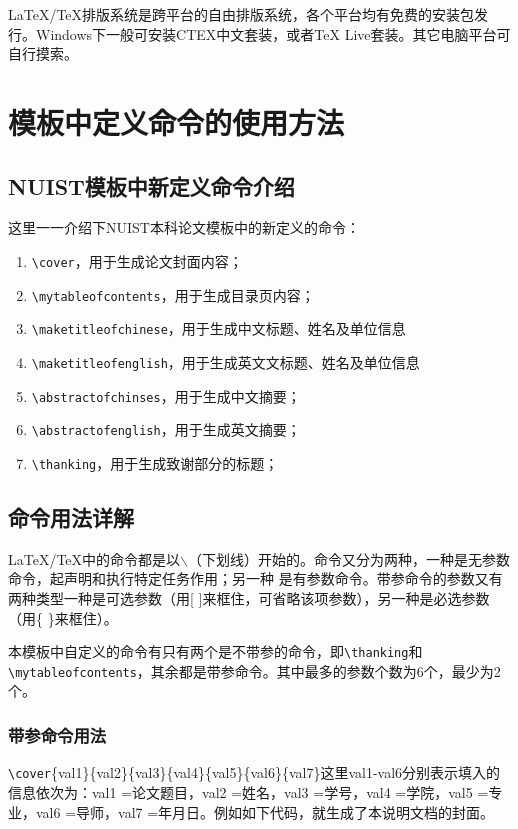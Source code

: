 \LaTeX/\TeX 排版系统是跨平台的自由排版系统，各个平台均有免费的安装包发行。Windows下一般可安装CTEX中文套装，或者TeX Live套装。其它电脑平台可自行摸索。

\section{模板中定义命令的使用方法}
\subsection{NUIST模板中新定义命令介绍}
这里一一介绍下NUIST本科论文模板中的新定义的命令：
{\color{blue}
\begin{enumerate}
\item \verb|\cover|，用于生成论文封面内容；
\item \verb|\mytableofcontents|，用于生成目录页内容；
\item \verb|\maketitleofchinese|，用于生成中文标题、姓名及单位信息
\item \verb|\maketitleofenglish|，用于生成英文文标题、姓名及单位信息
\item \verb|\abstractofchinses|，用于生成中文摘要；
\item \verb|\abstractofenglish|，用于生成英文摘要；
\item \verb|\thanking|，用于生成致谢部分的标题；
\end{enumerate}
}


\subsection{命令用法详解}
\LaTeX/\TeX 中的命令都是以$\backslash$（下划线）开始的。命令又分为两种，一种是无参数命令，起声明和执行特定任务作用；另一种 是有参数命令。带参命令的参数又有两种类型一种是可选参数（用[ ]来框住，可省略该项参数），另一种是必选参数（用\{ \}来框住）。

本模板中自定义的命令有只有两个是不带参的命令，即\verb|\thanking|和\verb|\mytableofcontents|，其余都是带参命令。其中最多的参数个数为6个，最少为2个。
\subsubsection{带参命令用法}
\verb|\cover|\{val1\}\{val2\}\{val3\}\{val4\}\{val5\}\{val6\}\{val7\}这里val1-val6分别表示填入的信息依次为：val1 =论文题目，val2 =姓名，val3 =学号，val4 =学院，val5 =专业，val6 =导师，val7 =年月日。例如如下代码，就生成了本说明文档的封面。



